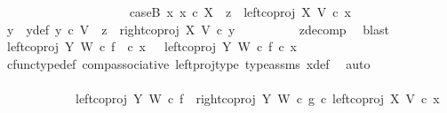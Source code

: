 \begin{isabellebody}
\ \ \ \ \ \ \isamarkupfalse%
\isanewline
\ \ \ \ \isamarkupfalse%
\ \isanewline
\ \ \ \ \ \ \isamarkupfalse%
\ caseB{\isacharcolon}{\kern0pt}\ {\isachardoublequoteopen}{\isasymnexists}x{}{\isachardot}{\kern0pt}\ x{}\ {\isasymin}\isactrlsub c\ X\ {\isasymand}\ z{}\ {\isacharequal}{\kern0pt}\ left{\isacharunderscore}{\kern0pt}coproj\ X\ V\ {\isasymcirc}\isactrlsub c\ x{}{\isachardoublequoteclose}\isanewline
\ \ \ \ \ \ \isamarkupfalse%
\ \isamarkupfalse%
\ y{}\ \ y{}{\isacharunderscore}{\kern0pt}def{\isacharcolon}{\kern0pt}\ {\isachardoublequoteopen}{\isacharparenleft}{\kern0pt}y{}\ {\isasymin}\isactrlsub c\ V\ {\isasymand}\ z{}\ {\isacharequal}{\kern0pt}\ right{\isacharunderscore}{\kern0pt}coproj\ X\ V\ {\isasymcirc}\isactrlsub c\ y{}{\isacharparenright}{\kern0pt}{\isachardoublequoteclose}\isanewline
\ \ \ \ \ \ \ \ \isamarkupfalse%
\ z{}{\isacharunderscore}{\kern0pt}decomp\ \isamarkupfalse%
\ blast\isanewline
\ \ \ \ \ \ \isamarkupfalse%
\ {\isachardoublequoteopen}left{\isacharunderscore}{\kern0pt}coproj\ Y\ W\ {\isasymcirc}\isactrlsub c\ f\ \ {\isasymcirc}\isactrlsub c\ x{}\ \ {\isacharequal}{\kern0pt}\ {\isacharparenleft}{\kern0pt}left{\isacharunderscore}{\kern0pt}coproj\ Y\ W\ {\isasymcirc}\isactrlsub c\ f{\isacharparenright}{\kern0pt}\ {\isasymcirc}\isactrlsub c\ x{}{\isachardoublequoteclose}\isanewline
\ \ \ \ \ \ \ \ \ \ \ \ \isamarkupfalse%
\ cfunc{\isacharunderscore}{\kern0pt}type{\isacharunderscore}{\kern0pt}def\ comp{\isacharunderscore}{\kern0pt}associative\ left{\isacharunderscore}{\kern0pt}proj{\isacharunderscore}{\kern0pt}type\ type{\isacharunderscore}{\kern0pt}assms{\isacharparenleft}{\kern0pt}{}{\isacharparenright}{\kern0pt}\ x{}{\isacharunderscore}{\kern0pt}def\ \isamarkupfalse%
\ auto\ \ \ \ \ \ \ \ \ \ \ \ \isanewline
\ \ \ \ \ \ \isamarkupfalse%
\ \isamarkupfalse%
\ {\isachardoublequoteopen}{\isachardot}{\kern0pt}{\isachardot}{\kern0pt}{\isachardot}{\kern0pt}\ {\isacharequal}{\kern0pt}\ \isanewline
\ \ \ \ \ \ \ \ \ \ \ \ {\isacharparenleft}{\kern0pt}{\isacharparenleft}{\kern0pt}{\isacharparenleft}{\kern0pt}left{\isacharunderscore}{\kern0pt}coproj\ Y\ W\ {\isasymcirc}\isactrlsub c\ f{\isacharparenright}{\kern0pt}\ {\isasymamalg}\ {\isacharparenleft}{\kern0pt}right{\isacharunderscore}{\kern0pt}coproj\ Y\ W\ {\isasymcirc}\isactrlsub c\ g{\isacharparenright}{\kern0pt}{\isacharparenright}{\kern0pt}\ {\isasymcirc}\isactrlsub c\ left{\isacharunderscore}{\kern0pt}coproj\ X\ V{\isacharparenright}{\kern0pt}\ {\isasymcirc}\isactrlsub c\ x{}{\isachardoublequoteclose}\isanewline

\end{isabellebody}
